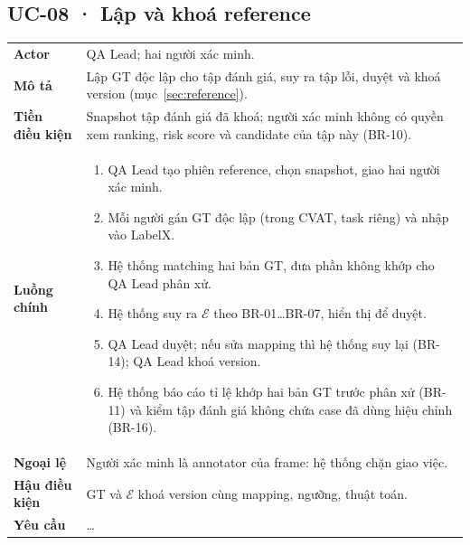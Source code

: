 \subsection*{UC-08 · Lập và khoá reference}
\begin{xltabular}{\linewidth}{@{}>{\bfseries}L{3.2cm}Y@{}}
\toprule
Actor & QA Lead; hai người xác minh.\\
Mô tả & Lập GT độc lập cho tập đánh giá, suy ra tập lỗi, duyệt và khoá version (mục~\ref{sec:reference}).\\
Tiền điều kiện & Snapshot tập đánh giá đã khoá; người xác minh không có quyền xem ranking, risk score và candidate của tập này (BR-10).\\
Luồng chính &
\begin{enumerate}[nosep]
  \item QA Lead tạo phiên reference, chọn snapshot, giao hai người xác minh.
  \item Mỗi người gán GT độc lập (trong CVAT, task riêng) và nhập vào LabelX.
  \item Hệ thống matching hai bản GT, đưa phần không khớp cho QA Lead phân xử.
  \item Hệ thống suy ra \(\mathcal{E}\) theo BR-01…BR-07, hiển thị để duyệt.
  \item QA Lead duyệt; nếu sửa mapping thì hệ thống suy lại (BR-14); QA Lead khoá version.
  \item Hệ thống báo cáo tỉ lệ khớp hai bản GT trước phân xử (BR-11) và kiểm tập đánh giá không chứa case đã dùng hiệu chỉnh (BR-16).
\end{enumerate}\\
Ngoại lệ & Người xác minh là annotator của frame: hệ thống chặn giao việc.\\
Hậu điều kiện & GT và \(\mathcal{E}\) khoá version cùng mapping, ngưỡng, thuật toán.\\
Yêu cầu & …\\
\bottomrule
\end{xltabular}

